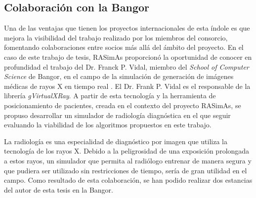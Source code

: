 \subsection{Colaboración con la \acl{Bangor}}
%
Una de las ventajas que tienen los proyectos internacionales de esta índole es que mejora la visibilidad del trabajo realizado por los miembros del consorcio, fomentando colaboraciones entre socios más allá del ámbito del proyecto.
%
En el caso de este trabajo de tesis, \ac{RASimAs} proporcionó la oportunidad de conocer en profundidad el trabajo del  Dr. Franck P. Vidal, miembro del  \emph{School of Computer Science} de \acl{Bangor}, en el campo de la simulación de generación de imágenes médicas de rayos X en tiempo real \cite{villard2014interventional}. El Dr. Frank P. Vidal es el responsable de la librería \emph{gVirtualXRay}\cite{sujar:hal}.
%
A partir de esta tecnología y la herramienta de posicionamiento de pacientes, creada en el contexto del proyecto \ac{RASimAs}, se propuso desarrollar un simulador de radiología diagnóstica en el que seguir evaluando la viabilidad de los algoritmos propuestos en este trabajo.

La radiología es una especialidad de diagnóstico por imagen que utiliza la tecnología de los rayos X. Debido a la peligrosidad de una exposición prolongada a estos rayos, un simulador que permita al radiólogo entrenar de manera segura y que pudiera ser utilizado sin restricciones de tiempo, sería de gran utilidad en el campo.
Como resultado de esta colaboración, se han podido realizar dos estancias del autor de esta tesis en la \acl{Bangor}. 






